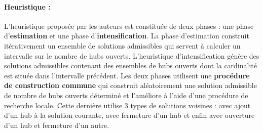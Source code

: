 \paragraph{Heuristique : }L'heuristique proposée par les auteurs est constituée de deux phases : une phase d'\textbf{estimation} et une phase d'\textbf{intensification}. La phase d'estimation construit itérativement un ensemble de solutions admissibles qui servent à calculer un intervalle sur le nombre de hubs ouverts.
L'heuristique d'intensification génère des solutions admissibles contenant des ensembles de hubs ouverts dont la cardinalité est située dans l'intervalle précédent.
Les deux phases utilisent une \textbf{procédure de construction commune} qui construit aléatoirement une solution admissible de nombre de hubs ouverts déterminé et l'améliore
à l'aide d'une procédure de recherche locale. Cette dernière utilise 3 types de solutions voisines : avec ajout d'un hub à la solution courante, avec fermeture d'un hub et enfin avec ouverture d'un hub et fermeture d'un autre.